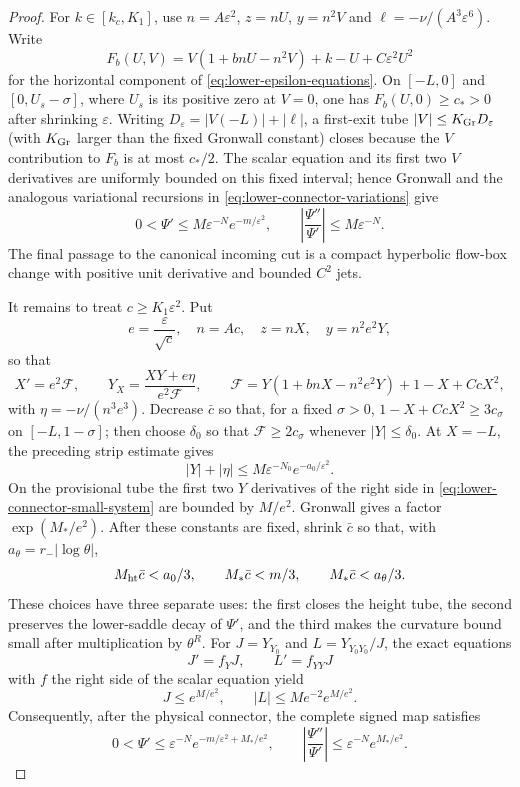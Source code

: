 \begin{proof}
For $k\in[k_c,K_1]$, use $n=A\varepsilon^2$, $z=nU$, $y=n^2V$ and
$\ell=-\nu/(A^3\varepsilon^6)$. Write
\[
 F_b(U,V)=V(1+bnU-n^2V)+k-U+C\varepsilon^2U^2
\]
for the horizontal component of \eqref{eq:lower-epsilon-equations}.
On $[-L,0]$ and $[0,U_s-\sigma]$, where $U_s$ is its positive
zero at $V=0$, one has $F_b(U,0)\ge c_*>0$ after shrinking
$\varepsilon$.
Writing $D_\varepsilon=|V(-L)|+|\ell|$, a first-exit tube
$|V|\le K_{\rm Gr}D_\varepsilon$ (with $K_{\rm Gr}$ larger than the fixed
Gronwall constant)
closes because the $V$ contribution to $F_b$ is at most $c_*/2$.
The scalar equation and its first two $V$ derivatives are uniformly bounded
on this fixed interval; hence Gronwall and the analogous variational
recursions in \eqref{eq:lower-connector-variations} give
\begin{equation}\label{eq:lower-middle-bounded}
 0<\Psi'\le M\varepsilon^{-N}e^{-m/\varepsilon^2},\qquad
 \left|\frac{\Psi''}{\Psi'}\right|\le M\varepsilon^{-N}.
\end{equation}
The final passage to the canonical incoming cut is a compact hyperbolic
flow-box change with positive unit derivative and bounded $C^2$ jets.

It remains to treat $c\ge K_1\varepsilon^2$.  Put
\[
 e=\frac{\varepsilon}{\sqrt c},\quad n=Ac,\quad z=nX,
 \quad y=n^2e^2Y,
\]
so that
\begin{equation}\label{eq:lower-connector-small-system}
 X'=e^2\mathcal F,\qquad Y_X=\frac{XY+e\eta}{e^2\mathcal F},\qquad
 \mathcal F=Y(1+bnX-n^2e^2Y)+1-X+CcX^2,
\end{equation}
with $\eta=-\nu/(n^3e^3)$.  Decrease $\bar c$ so that, for a fixed
$\sigma>0$, $1-X+CcX^2\ge3c_\sigma$ on $[-L,1-\sigma]$; then choose
$\delta_0$ so that $\mathcal F\ge2c_\sigma$ whenever $|Y|\le\delta_0$.
At $X=-L$, the preceding strip estimate gives
\[
 |Y|+|\eta|\le M\varepsilon^{-N_0}e^{-a_0/\varepsilon^2}.
\]
On the provisional tube the first two $Y$ derivatives of the right side in
\eqref{eq:lower-connector-small-system} are bounded by $M/e^2$.
Gronwall gives a factor $\exp(M_*/e^2)$.  After these constants are fixed,
shrink $\bar c$ so that, with $a_\theta=r_-|\log\theta|$,
\begin{equation}\label{eq:lower-connector-exponents}
 M_{\rm ht}\bar c<a_0/3,\qquad M_*\bar c<m/3,\qquad
 M_*\bar c<a_\theta/3.
\end{equation}
These choices have three separate uses: the first closes the height
tube, the second preserves the lower-saddle decay of $\Psi'$, and the
third makes the curvature bound small after multiplication by $\theta^R$.
For $J=Y_{Y_0}$ and $L=Y_{Y_0Y_0}/J$, the exact equations
\[
 J'=f_YJ,\qquad L'=f_{YY}J
\]
with $f$ the right side of the scalar equation yield
\[
 J\le e^{M/e^2},\qquad |L|\le Me^{-2}e^{M/e^2}.
\]
Consequently, after the physical connector, the complete signed map satisfies
\begin{equation}\label{eq:lower-middle-small-ratio}
 0<\Psi'\le\varepsilon^{-N}e^{-m/\varepsilon^2+M_*/e^2},\qquad
 \left|\frac{\Psi''}{\Psi'}\right|
 \le\varepsilon^{-N}e^{M_*/e^2}.
\end{equation}


\end{proof}
